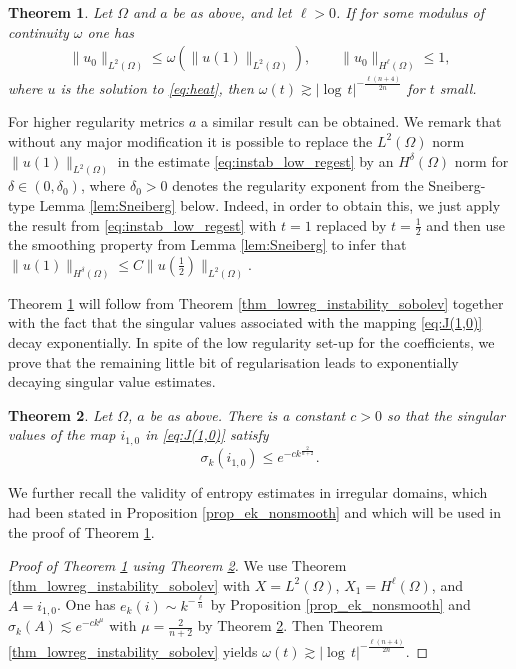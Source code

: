 \documentclass[12pt,twoside]{amsart}
\numberwithin{equation}{section}
\renewcommand{\le}{\leqslant}
\renewcommand{\leq}{\leqslant}
\newtheorem{theorem}{Theorem}[section]
\newcommand{\abs}[1]{\lvert #1 \rvert}          %
\begin{document}
\begin{theorem}
\label{thm:instab_low_reg}
Let $\Omega$ and $a$ be as above, and let $\ell > 0$. If for some modulus of continuity $\omega$ one has 
\begin{align}
\label{eq:instab_low_regest}
\|u_0\|_{L^2(\Omega)} \leq \omega(\|u(1)\|_{L^2(\Omega)}), \qquad \|u_0\|_{H^{\ell}(\Omega)} \leq 1,
\end{align}
where $u$ is the solution to \eqref{eq:heat}, then $\omega(t) \gtrsim \abs{\log\,t}^{-\frac{\ell(n+4)}{2n}}$ for $t$ small.
\end{theorem}

For higher regularity metrics $a$ a similar result can be obtained.
We remark that without any major modification it is possible to replace the $L^2(\Omega)$ norm $\|u(1)\|_{L^2(\Omega)}$ in the estimate \eqref{eq:instab_low_regest} by an $H^{\delta}(\Omega)$ norm for $\delta \in (0,\delta_0)$, where $\delta_0>0$ denotes the regularity exponent from the Sneiberg-type Lemma \ref{lem:Sneiberg} below. Indeed, in order to obtain this, we just apply the result from \eqref{eq:instab_low_regest} with $t=1$ replaced by $t= \frac{1}{2}$ and then use the smoothing property from Lemma \ref{lem:Sneiberg} to infer that $\|u(1)\|_{H^{\delta}(\Omega)} \leq C \|u(\frac{1}{2})\|_{L^2(\Omega)}$.



Theorem \ref{thm:instab_low_reg} will follow from Theorem \ref{thm_lowreg_instability_sobolev} together with the fact that the singular values associated with the mapping \eqref{eq:J(1,0)}
decay exponentially.
In spite of the low regularity set-up for the coefficients, we prove that the remaining little bit of regularisation leads to exponentially decaying singular value estimates.



\begin{theorem} \label{thm:entropy_backward_heat}
Let $\Omega$,  $a$ be as above. There is a constant $c > 0$ so that the singular values of the map $i_{1,0}$ in \eqref{eq:J(1,0)} satisfy 
  \[ \sigma_k(i_{1,0}) \le e^{-c k^{\frac{2}{n+2}}}. \]
\end{theorem}

We further recall the validity of entropy estimates in irregular domains, which had been stated in Proposition \ref{prop_ek_nonsmooth} and which will be used in the proof of Theorem \ref{thm:instab_low_reg}.

\begin{proof}[Proof of Theorem \ref{thm:instab_low_reg} using Theorem \ref{thm:entropy_backward_heat}]
We use Theorem \ref{thm_lowreg_instability_sobolev} with $X = L^2(\Omega)$, $X_1 = H^{\ell}(\Omega)$, and $A = i_{1,0}$. One has $e_k(i) \sim k^{-\frac{\ell}{n}}$ by Proposition \ref{prop_ek_nonsmooth} and $\sigma_k(A) \lesssim e^{-c k^{\mu}}$ with $\mu = \frac{2}{n+2}$ by Theorem \ref{thm:entropy_backward_heat}. Then Theorem \ref{thm_lowreg_instability_sobolev} yields $\omega(t) \gtrsim \abs{\log\,t}^{-\frac{\ell(n+4)}{2n}}$.
\end{proof}
\end{document}
